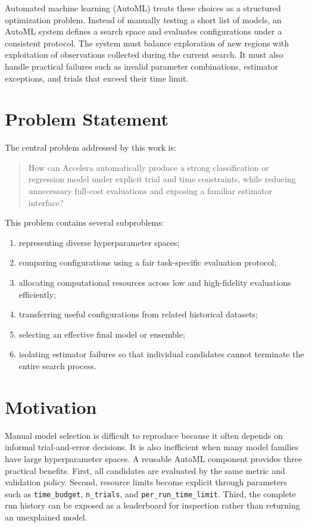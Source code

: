 \documentclass[12pt,a4paper,oneside]{report}
\begin{document}
\medskip

\noindent Automated machine learning (AutoML) treats these choices as a structured
optimization problem. Instead of manually testing a short list of models, an
AutoML system defines a search space and evaluates configurations under a
consistent protocol. The system must balance exploration of new regions with
exploitation of observations collected during the current search. It must also
handle practical failures such as invalid parameter combinations, estimator
exceptions, and trials that exceed their time limit.

\section{Problem Statement}

The central problem addressed by this work is:

\begin{quote}
How can Accelera automatically produce a strong classification or regression
model under explicit trial and time constraints, while reducing unnecessary
full-cost evaluations and exposing a familiar estimator interface?
\end{quote}

\noindent This problem contains several subproblems:

\begin{enumerate}[leftmargin=*]
  \item representing diverse hyperparameter spaces;
  \item comparing configurations using a fair task-specific evaluation protocol;
  \item allocating computational resources across low and high-fidelity evaluations efficiently;
  \item transferring useful configurations from related historical datasets;
  \item selecting an effective final model or ensemble;
  \item isolating estimator failures so that individual candidates cannot terminate the entire search process.
\end{enumerate}

\section{Motivation}

Manual model selection is difficult to reproduce because it often depends on
informal trial-and-error decisions. It is also inefficient when many model
families have large hyperparameter spaces. A reusable AutoML component provides
three practical benefits. First, all candidates are evaluated by the same
metric and validation policy. Second, resource limits become explicit through
parameters such as \texttt{time\_budget}, \texttt{n\_trials}, and
\texttt{per\_run\_time\_limit}. Third, the complete run history can be exposed
as a leaderboard for inspection rather than returning an unexplained model.
\end{document}
